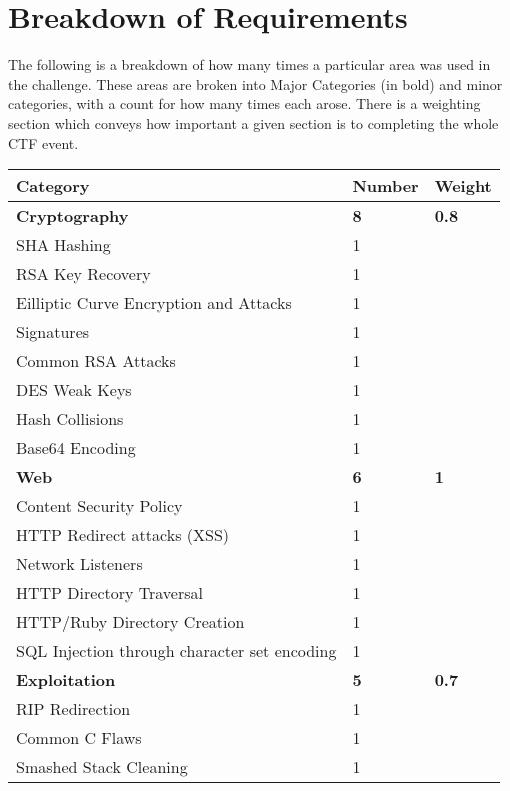 \documentclass[twoside,a4paper,11pt]{report}
\begin{document}
	\section{Breakdown of Requirements}
	 	The following is a breakdown of how many times a particular area was used in the challenge. 
		These areas are broken into Major Categories (in bold) and minor categories, with a count for how many times each arose. 
		There is a weighting section which conveys how important a given section is to completing the whole CTF event. 
		\begin{table}[H]
			\centering
			\begin{tabular}{| l | l | l |}
				\hline
				\textbf{Category} & \textbf{Number} & \textbf{Weight} \\ \hline 
				\textbf{Cryptography} & \textbf{8} & \textbf{0.8}\\ \hline
				\quad SHA Hashing & 1 & \\ \hline 
				\quad RSA Key Recovery & 1 & \\ \hline
				\quad Eilliptic Curve Encryption and Attacks & 1 & \\ \hline
				\quad Signatures & 1 & \\ \hline 
				\quad Common RSA Attacks & 1 & \\ \hline
				\quad DES Weak Keys & 1 & \\ \hline 
				\quad Hash Collisions & 1 & \\ \hline 
				\quad Base64 Encoding & 1 & \\ \hline 
				\textbf{Web} & \textbf{6} & \textbf{1} \\ \hline 
				\quad Content Security Policy & 1 & \\ \hline 
				\quad HTTP Redirect attacks (XSS) & 1 & \\ \hline 
				\quad Network Listeners & 1 & \\ \hline 
				\quad HTTP Directory Traversal & 1 & \\ \hline 
				\quad HTTP/Ruby Directory Creation & 1 & \\ \hline 
				\quad SQL Injection through character set encoding & 1 & \\ \hline 
				\textbf{Exploitation} & \textbf{5} & \textbf{0.7} \\ \hline 
				\quad RIP Redirection & 1 & \\ \hline 
				\quad Common C Flaws & 1 & \\ \hline 
				\quad Smashed Stack Cleaning & 1 & \\ \hline 

\end{tabular}
\end{table}
\end{document}
